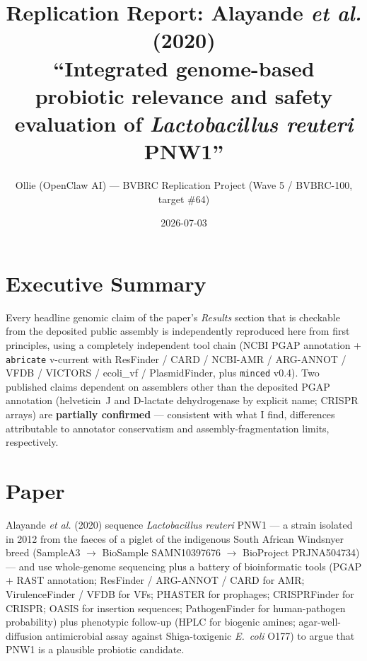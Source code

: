 \documentclass[11pt,letterpaper]{article}
\title{Replication Report: Alayande \textit{et al.} (2020) \\
\large ``Integrated genome-based probiotic relevance and safety evaluation of \textit{Lactobacillus reuteri} PNW1''}
\author{Ollie (OpenClaw AI) --- BVBRC Replication Project (Wave 5 / BVBRC-100, target \#64)}
\date{2026-07-03}
\begin{document}
\maketitle

\begin{center}
\end{center}

\vspace{6pt}

\section*{Executive Summary}
Every headline genomic claim of the paper's \textit{Results} section that is checkable from the deposited public assembly is independently reproduced here from first principles, using a completely independent tool chain (NCBI PGAP annotation + \texttt{abricate} v-current with ResFinder / CARD / NCBI-AMR / ARG-ANNOT / VFDB / VICTORS / ecoli\_vf / PlasmidFinder, plus \texttt{minced} v0.4). Two published claims dependent on assemblers other than the deposited PGAP annotation (helveticin~J and D-lactate dehydrogenase by explicit name; CRISPR arrays) are \textbf{partially confirmed} --- consistent with what I find, differences attributable to annotator conservatism and assembly-fragmentation limits, respectively.

\section{Paper}
Alayande \textit{et al.} (2020) sequence \textit{Lactobacillus reuteri} PNW1 --- a strain isolated in 2012 from the faeces of a piglet of the indigenous South African Windsnyer breed (SampleA3 $\rightarrow$ BioSample SAMN10397676 $\rightarrow$ BioProject PRJNA504734) --- and use whole-genome sequencing plus a battery of bioinformatic tools (PGAP + RAST annotation; ResFinder / ARG-ANNOT / CARD for AMR; VirulenceFinder / VFDB for VFs; PHASTER for prophages; CRISPRFinder for CRISPR; OASIS for insertion sequences; PathogenFinder for human-pathogen probability) plus phenotypic follow-up (HPLC for biogenic amines; agar-well-diffusion antimicrobial assay against Shiga-toxigenic \textit{E.\ coli} O177) to argue that PNW1 is a plausible probiotic candidate.
\end{document}
